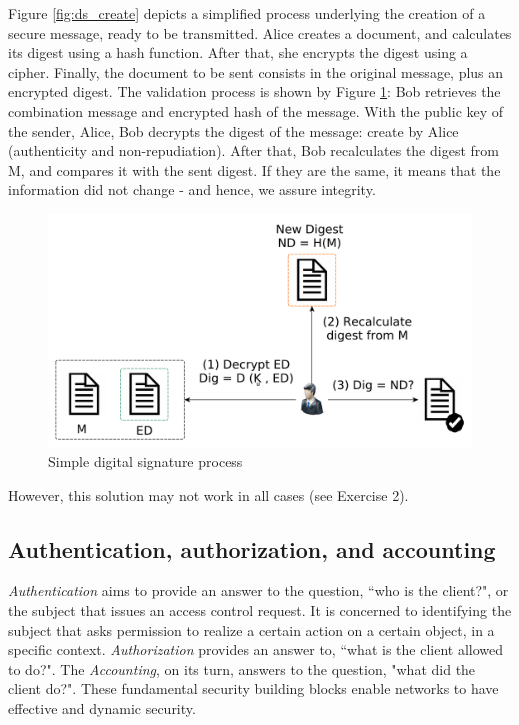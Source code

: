 \documentclass[12pt,a4paper]{article}
\theoremstyle{definition}
\begin{document}
Figure \ref{fig:ds_create} depicts a simplified process underlying the creation of a secure message, ready to be transmitted. Alice creates a document, and calculates its digest using a hash function. After that, she encrypts the digest using a cipher. Finally, the document to be sent consists in the original message, plus an encrypted digest. The validation process is shown by Figure \ref{fig:ds_validate}: Bob retrieves the combination message and encrypted hash of the message. With the public key of the sender, Alice, Bob decrypts the digest of the message: create by Alice (authenticity and non-repudiation). After that, Bob recalculates the digest from M, and compares it with the sent digest. If they are the same, it means that the information did not change - and hence, we assure integrity. 

\begin{figure}[h]
    \centering
    \includegraphics[scale=0.4]{figures/digital_signature_validate.pdf}
    \caption{Simple digital signature process}
    \label{fig:ds_validate}
\end{figure}

However, this solution may not work in all cases (see Exercise 2). 

\subsection{ Authentication, authorization, and accounting}
\emph{Authentication} aims to provide an answer to the question, ``who is the client?", or the subject that issues an access control request. It is concerned to identifying the subject that asks permission to realize a certain action on a certain object, in a specific context. \emph{Authorization} provides an answer to, ``what is the client allowed to do?". The \emph{Accounting}, on its turn, answers to the question, "what did the client do?". These fundamental security building blocks enable networks to have effective and dynamic security.
\end{document}
